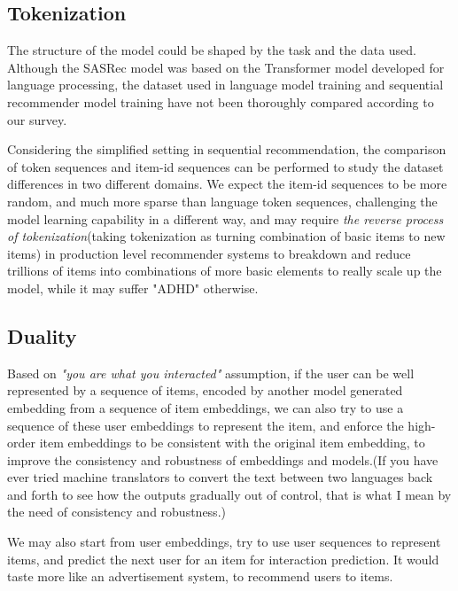 \documentclass{article}
\begin{document}


\subsection{Tokenization}

The structure of the model could be shaped by the task and the data used.
Although the SASRec model was based on the Transformer model developed for language processing,
the dataset used in language model training and sequential recommender model training have not been thoroughly compared according to our survey.

Considering the simplified setting in sequential recommendation,
the comparison of token sequences and item-id sequences can be performed to study the dataset differences in two different domains.
We expect the item-id sequences to be more random, and much more sparse than language token sequences, challenging the model learning capability in a different way,
and may require \emph{the reverse process of tokenization}(taking tokenization as turning combination of basic items to new items)
in production level recommender systems to breakdown and reduce trillions of items into combinations of more basic elements to really scale up the model, while it may suffer "ADHD" otherwise.

\subsection{Duality}


Based on \emph{"you are what you interacted"} assumption,
if the user can be well represented by a sequence of items,
encoded by another model generated embedding from a sequence of item embeddings,
we can also try to use a sequence of these user embeddings to represent the item,
and enforce the high-order item embeddings to be consistent
with the original item embedding,
to improve the consistency and robustness of embeddings and models.(If you have ever tried machine translators to convert the text between two languages back and forth to see how the outputs gradually out of control, that is what I mean by the need of consistency and robustness.)

We may also start from user embeddings,
try to use user sequences to represent items,
and predict the next user for an item
for interaction prediction.
It would taste more like an advertisement system,
to recommend users to items.
\end{document}
